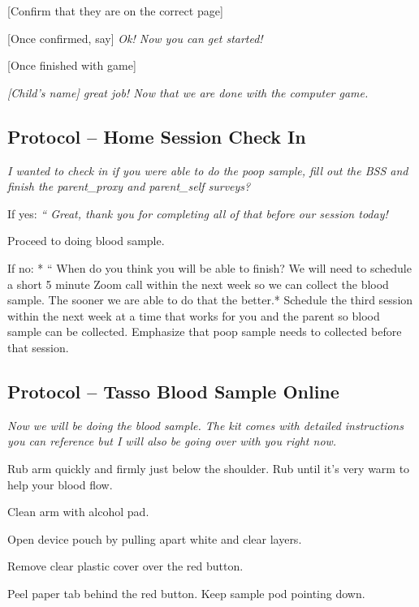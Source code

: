 \documentclass[]{book}
\begin{document}
{[}Confirm that they are on the correct page{]}

{[}Once confirmed, say{]} \emph{Ok! Now you can get started!}

{[}Once finished with game{]}

\emph{{[}Child's name{]} great job! Now that we are done with the computer game.}

\hypertarget{protocol-home-session-check-in-2}{%
\subsection{Protocol -- Home Session Check In}\label{protocol-home-session-check-in-2}}

\emph{I wanted to check in if you were able to do the poop sample, fill out the BSS and finish the parent\_proxy and parent\_self surveys?}

If yes: \emph{`` Great, thank you for completing all of that before our session today!}

Proceed to doing blood sample.

If no: * `` When do you think you will be able to finish? We will need to schedule a short 5 minute Zoom call within the next week so we can collect the blood sample. The sooner we are able to do that the better.* Schedule the third session within the next week at a time that works for you and the parent so blood sample can be collected. Emphasize that poop sample needs to collected before that session.

\hypertarget{protocol-tasso-blood-sample-online-2}{%
\subsection{Protocol -- Tasso Blood Sample Online}\label{protocol-tasso-blood-sample-online-2}}

\emph{Now we will be doing the blood sample. The kit comes with detailed instructions you can reference but I will also be going over with you right now. }

Rub arm quickly and firmly just below the shoulder. Rub until it's very warm to help your blood flow.

Clean arm with alcohol pad.

Open device pouch by pulling apart white and clear layers.

Remove clear plastic cover over the red button.

Peel paper tab behind the red button. Keep sample pod pointing down.
\end{document}
